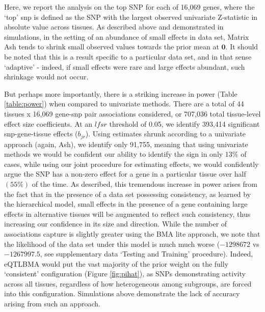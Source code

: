
Here, we report the analysis on the top SNP for each of 16,069 genes, where the `top' snp is defined as the SNP with the largest observed univariate Z-statistic in absolute value across tissues. As described above and demonstrated in simulations, in the setting of an abundance of small effects in data set, Matrix Ash tends to shrink small observed values towards the prior mean at $\bm{0}$. It should be noted that this is a result specific to a particular data set, and in that sense `adaptive' - indeed, if small effects were rare and large effects abundant, such shrinkage would not occur. 

But perhaps more importantly, there is a striking increase in power (Table \ref{table:power}) when compared to univariate methods. There are a total of 44 tissues x 16,069 gene-snp pair associations considered, or 707,036 total tissue-level effect size coefficients. At an $lfsr$ threshold of 0.05, we identify 393,414 significant snp-gene-tissue effects ($b_{jr}$). Using estimates shrunk according to a univariate approach (again, Ash),  we identify only 91,755, meaning that using univariate methods we would be confident our ability to identify the sign in only $13\%$ of cases, while using our joint procedure for estimating effects, we would confidently argue the SNP has a non-zero effect for a gene in a particular tissue over half $(55\%)$ of the time. As described, this tremendous increase in power arises from the fact that in the presence of  a data set possessing consistency, as learned by the hierarchical model, small effects in the presence of a gene containing large effects in alternative tissues will be augmented to reflect such consistency, thus increasing our confidence in its size and direction. While the number of associations capture is slightly greater using the BMA lite approach, we note that the likelihood of the data set under this model is much much worse ($-1298672$ vs $-1267997.5$, see supplementary data `Testing and Training' procedure). Indeed, eQTLBMA would put the vast majority of the prior weight on the fully `consistent' configuration (Figure \ref{fig:pihat}), as SNPs demonstrating activity across all tissues, regardless of how heterogeneous among subgroups, are forced into this configuration. Simulations above demonstrate the lack of accuracy arising from such an approach. %


